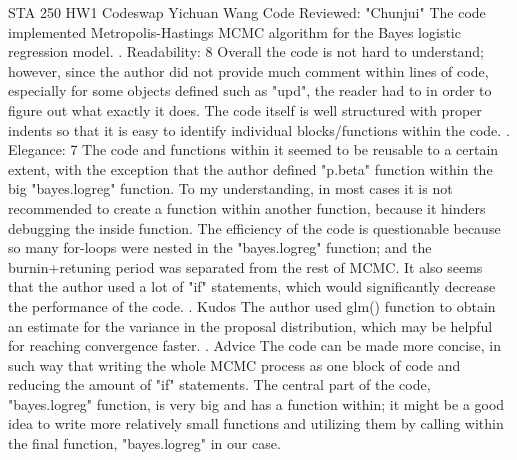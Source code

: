\documentclass[12pt]{article}
\begin{document}
\noindent STA 250 HW1 Codeswap \newline Yichuan Wang \newline \newline
Code Reviewed: "Chunjui" \newline \newline
The code implemented Metropolis-Hastings MCMC algorithm for the Bayes logistic regression model. . Readability: 8 \newline
Overall the code is not hard to understand; however, since the author did not provide much comment within lines of code, especially for some objects defined such as "upd", the reader had to in order to figure out what exactly it does. The code itself is well structured with proper indents  so that it is easy to identify individual blocks/functions within the code. . Elegance: 7 \newline
The code and functions within it seemed to be reusable to a certain extent, with the exception that the author defined "p.beta" function within the big "bayes.logreg" function. To my understanding, in most cases it is not recommended to create a function within another function, because it hinders debugging the inside function. The efficiency of the code is questionable because so many for-loops were nested in the "bayes.logreg" function; and the burnin+retuning period was separated from the rest of MCMC. It also seems that the author used a lot of "if" statements, which would significantly decrease the performance of the code. . Kudos \newline
The author used glm() function to obtain an estimate for the variance in the proposal distribution, which may be helpful for reaching convergence faster. . Advice \newline
The code can be made more concise, in such way that writing the whole MCMC process as one block of code and reducing the amount of "if" statements. The central part of the code, "bayes.logreg" function, is very big and has a function within; it might be a good idea to write more relatively small functions and utilizing them by calling within the final function, "bayes.logreg" in our case.
\end{document}
